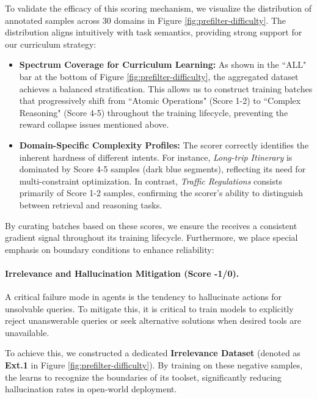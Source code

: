 To validate the efficacy of this scoring mechanism, we visualize the distribution of annotated samples across 30 domains in Figure \ref{fig:prefilter-difficulty}. The distribution aligns intuitively with task semantics, providing strong support for our curriculum strategy:
\begin{itemize}\item \textbf{Spectrum Coverage for Curriculum Learning:} As shown in the ``ALL" bar at the bottom of Figure \ref{fig:prefilter-difficulty}, the aggregated dataset achieves a balanced stratification. This allows us to construct training batches that progressively shift from ``Atomic Operations" (Score 1-2) to ``Complex Reasoning" (Score 4-5) throughout the training lifecycle, preventing the reward collapse issues mentioned above.\item \textbf{Domain-Specific Complexity Profiles:} The scorer correctly identifies the inherent hardness of different intents. For instance, \textit{Long-trip Itinerary} is dominated by Score 4-5 samples (dark blue segments), reflecting its need for multi-constraint optimization. In contrast, \textit{Traffic Regulations} consists primarily of Score 1-2 samples, confirming the scorer's ability to distinguish between retrieval and reasoning tasks.
\end{itemize}

By curating batches based on these scores, we ensure the \model receives a consistent gradient signal throughout its training lifecycle. Furthermore, we place special emphasis on boundary conditions to enhance reliability:




\paragraph{Irrelevance and Hallucination Mitigation (Score -1/0).} A critical failure mode in agents is the tendency to hallucinate actions for unsolvable queries. To mitigate this, it is critical to train models to explicitly reject unanswerable queries or seek alternative solutions when desired tools are unavailable.

To achieve this, we constructed a dedicated \textbf{Irrelevance Dataset} (denoted as \textbf{Ext.1} in Figure \ref{fig:prefilter-difficulty}). By training on these negative samples, the \model learns to recognize the boundaries of its toolset, significantly reducing hallucination rates in open-world deployment.